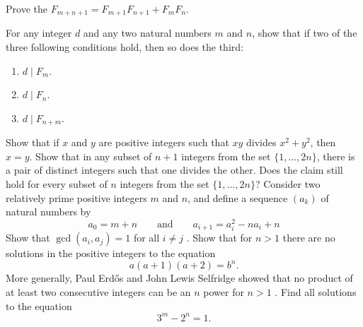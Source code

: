 \begin{challenge}
  \exercise
  \label{exercise:addition-formula-fibonacci}
  \begin{subexenum}
  \item Prove the  $F_{m+n+1} = F_{m+1}F_{n+1} + F_{m}F_{n}$.
  \item For any integer $d$ and any two natural numbers $m$ and $n$, show that if two of the three following conditions hold, then so does the third:
    \begin{enumerate}
    \item $d\mid F_m$.
    \item $d\mid F_n$.
    \item $d\mid F_{n+m}$.
    \end{enumerate}
  \end{subexenum}
  \exercise
  \label{exercise:div-product-sum-of-squares}
  Show that if $x$ and $y$ are positive integers such that $xy$ divides $x^2+y^2$, then $x=y$.
  \exercise Show that in any subset of $n+1$ integers from the set $\{1,\ldots,2n\}$, there is a pair of distinct integers such that one divides the other. Does the claim still hold for every subset of $n$ integers from the set $\{1,\ldots,2n\}$?
  \exercise Consider two relatively prime positive integers $m$ and $n$, and define a sequence $(a_k)$ of natural numbers by
  \begin{equation*}
    a_0=m+n \qquad\text{and}\qquad a_{i+1}=a_i^2-na_i+n
  \end{equation*}
  Show that $\gcd(a_i,a_j)=1$ for all $i\neq j$ \cite{mohanty1978}.
  \exercise Show that for $n>1$ there are no solutions in the positive integers to the equation
  \begin{equation*}
    a(a+1)(a+2)=b^n.
  \end{equation*}
  More generally, Paul Erd\H{o}s and John Lewis Selfridge showed that no product of at least two consecutive integers can be an $n$\supth{} power for $n>1$ \cite{erdosselfridge1975}.
  \exercise Find all solutions to the equation
  \begin{equation*}
    3^m-2^n=1.
  \end{equation*}
\end{challenge}


